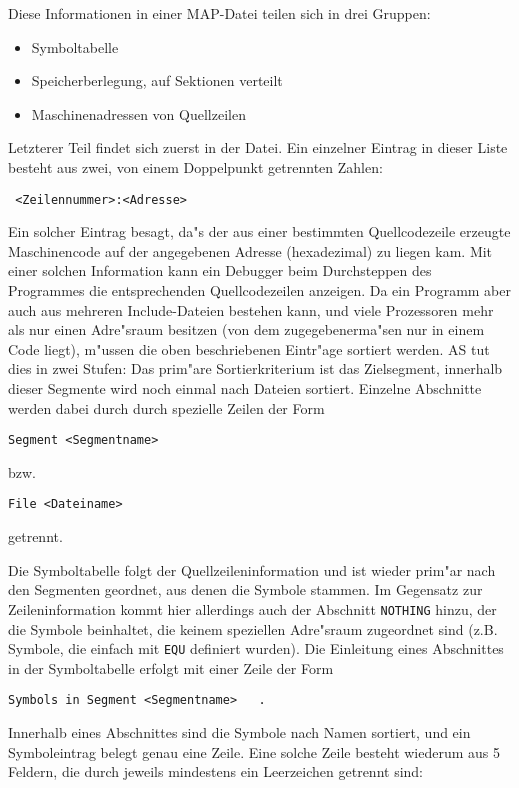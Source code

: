 \documentclass[12pt,a4paper,twoside]{report}
\newcommand{\tty}[1]{{\tt #1}}
\begin{document}
Diese Informationen in einer MAP-Datei teilen sich in drei Gruppen:
\begin{itemize}
\item{Symboltabelle}
\item{Speicherberlegung, auf Sektionen verteilt}
\item{Maschinenadressen von Quellzeilen}
\end{itemize}
Letzterer Teil findet sich zuerst in der Datei.  Ein einzelner
Eintrag in dieser Liste besteht aus zwei, von einem Doppelpunkt
getrennten Zahlen:
\begin{verbatim}
 <Zeilennummer>:<Adresse>
\end{verbatim}
Ein solcher Eintrag besagt, da"s der aus einer bestimmten
Quellcodezeile erzeugte Maschinencode auf der angegebenen Adresse
(hexadezimal) zu liegen kam.  Mit einer solchen Information kann ein
Debugger beim Durchsteppen des Programmes die entsprechenden
Quellcodezeilen anzeigen.  Da ein Programm aber auch aus mehreren
Include-Dateien bestehen kann, und viele Prozessoren mehr als nur
einen Adre"sraum besitzen (von dem zugegebenerma"sen nur in einem Code
liegt), m"ussen die oben beschriebenen Eintr"age sortiert werden.  AS
tut dies in zwei Stufen: Das prim"are Sortierkriterium ist das
Zielsegment, innerhalb dieser Segmente wird noch einmal nach Dateien
sortiert.  Einzelne Abschnitte werden dabei durch durch spezielle
Zeilen der Form
\begin{verbatim}
Segment <Segmentname>
\end{verbatim}
bzw.
\begin{verbatim}
File <Dateiname>
\end{verbatim}
getrennt.

Die Symboltabelle folgt der Quellzeileninformation und ist wieder
prim"ar nach den Segmenten geordnet, aus denen die Symbole stammen.
Im Gegensatz zur Zeileninformation kommt hier allerdings auch der
Abschnitt \tty{NOTHING} hinzu, der die Symbole beinhaltet, die keinem
speziellen Adre"sraum zugeordnet sind (z.B. Symbole, die einfach mit
\tty{EQU} definiert wurden).  Die Einleitung eines Abschnittes in der
Symboltabelle erfolgt mit einer Zeile der Form
\begin{verbatim}
Symbols in Segment <Segmentname>   .
\end{verbatim}
Innerhalb eines Abschnittes sind die Symbole nach Namen sortiert, und
ein Symboleintrag belegt genau eine Zeile.  Eine solche Zeile besteht
wiederum aus 5 Feldern, die durch jeweils mindestens ein Leerzeichen
getrennt sind:
\end{document}
